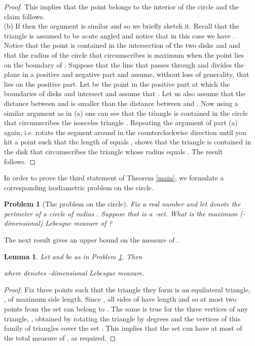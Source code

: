 \documentclass[12pt]{article}
\newtheorem{lemma}[thm]{Lemma}
\newtheorem{prbl}[thm]{Problem}
\begin{document}
\begin{proof}
This implies that the point  belongs to the interior of the circle  and the claim follows. \\
(b) If  then the argument is similar and so we briefly 
sketch it. Recall that the triangle is assumed to be acute angled 
and notice that in this case we have . 
Notice that the point  is contained in the intersection of the two disks  and  and 
that the radius of the circle that circumscribes  is maximum when the point  lies on the 
boundary of . 
Suppose that the line that passes through  and  divides the plane in a positive and negative part 
and assume, 
without loss of generality, that 
 lies on the positive part. Let  be the point in the positive part at which the 
boundaries of disks  and  intersect and assume that . 
Let us also assume that the distance between  and  is smaller than 
the distance between  and . 
Now using a similar argument as in (a) one can    
see that the triangle  is contained in the circle that circumscribes the  
isosceles triangle .
Repeating the argument of part (a) again, i.e. rotate the segment   
 around 
in the counterclockwise direction until you hit a point  such that the length 
of  equals , shows that the triangle  is contained 
in the disk that circumscribes the triangle  
whose radius equals .
The result follows. 
\end{proof}




In order to prove the third statement of Theorem \ref{main}, we formulate 
a corresponding isodiametric problem on the circle.

\begin{prbl}[The problem on the circle]
\label{circle}
Fix a real number  and let  denote the perimeter of a circle of radius .
Suppose that   is a -set. What is the maximum 
(-dimensional) Lebesgue measure of ?  \end{prbl}

The next result gives an upper  bound on 
the measure of .

\begin{lemma}
\label{cycle} Let  and  be as in Problem \ref{circle}. Then 

where  denotes -dimensional Lebesgue measure.
\end{lemma} 
\begin{proof} Fix three points  such that the triangle they form is 
an equilateral triangle, , of maximum side length. Since , 
all sides of  have length  and so at most two 
points from the set  can belong to . The same 
is true for the three vertices of any triangle, , obtained 
by rotating the triangle 
 by  degrees and the vertices of this family of triangles cover the set . 
This implies that the set  can have at most  of the total measure of , as required.
\end{proof}
\end{document}
